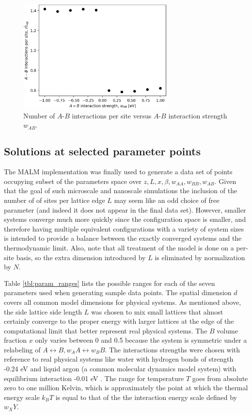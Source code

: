 \documentclass[10pt]{article}
\begin{document}
\begin{figure}[h!]
\centering
\includegraphics[width=0.70\textwidth]{Figures/m_AB_hat_versus_w_AB.png}
\caption{Number of $A$-$B$ interactions per site versus $A$-$B$ interaction strength $w_{AB}$.}
\label{fig:m_AB_hat_versus_w_AB}
\end{figure}

\subsection{Solutions at selected parameter points}
The MALM implementation was finally used to generate a data set of points occupying subset of the parameters space over $z,L,x,\beta,w_{AA},w_{BB},w_{AB}$.
Given that the goal of such microscale and nanoscale simulations the inclusion of the number of of sites per lattice edge $L$ may seem like an odd choice of free parameter (and indeed it does not appear in the final data set).
However, smaller systems converge much more quickly since the configuration space is smaller, and therefore having multiple equivalent configurations with a variety of system sizes is intended to provide a balance between the exactly converged systems and the thermodynamic limit.
Also, note that all treatment of the model is done on a per-site basis, so the extra dimension introduced by $L$ is eliminated by normalization by $N$.

Table \ref{tbl:param_ranges} lists the possible ranges for each of the seven parameters used when generating sample data points.
The spatial dimension $d$ covers all common model dimensions for physical systems.
As mentioned above, the side lattice side length $L$ was chosen to mix small lattices that almost certainly converge to the proper energy with larger lattices at the edge of the computational limit that better represent real physical systems.
The $B$ volume fraction $x$ only varies between 0 and 0.5 because the system is symmetric under a relabeling of $A \longleftrightarrow B, w_AA \longleftrightarrow w_BB$.
The interactions strengths were chosen with reference to real physical systems like water with hydrogen bonds of strength -0.24 eV and liquid argon (a common molecular dynamics model system) with equilibrium interaction -0.01 eV \cite{water} \cite{argon}.
The range for temperature $T$ goes from absolute zero to one million Kelvin, which is approximately the point at which the thermal energy scale $k_B T$ is equal to that of the the interaction energy scale defined by $w_XY$.
\end{document}
